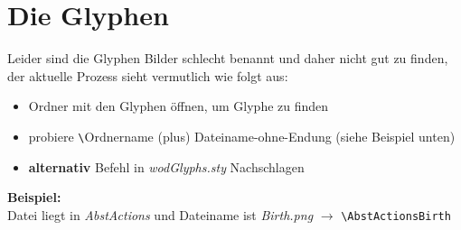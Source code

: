 \documentclass[ngerman,LQ,Vampire]{WoDTeX}
\begin{document}
\section*{Die Glyphen}
Leider sind die Glyphen Bilder schlecht benannt und daher nicht gut zu finden, der aktuelle Prozess sieht vermutlich wie folgt aus:
\begin{itemize}
\item Ordner mit den Glyphen öffnen, um Glyphe zu finden
\item probiere \verb|\|Ordnername (plus) Dateiname-ohne-Endung (siehe Beispiel unten)
\item \textbf{alternativ} Befehl in  \textit{wodGlyphs.sty} Nachschlagen
\end{itemize}
\textbf{Beispiel:}\\
Datei liegt in \textit{AbstActions} und Dateiname ist \textit{Birth.png} $\rightarrow$ \verb|\AbstActionsBirth|
\end{document}
